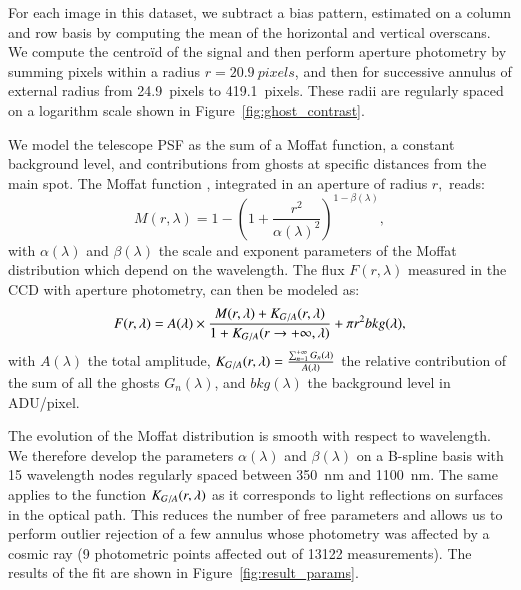 For each image in this dataset, we subtract a bias pattern, estimated on a column and row basis by computing the mean of the horizontal and vertical overscans. We compute the centroïd of the signal and then perform aperture photometry by summing pixels within a radius $r=\SI{20.9}{pixels}$, and then for successive annulus of external radius from \SI{24.9}{pixels} to \SI{419.1}{pixels}. These radii are regularly spaced on a logarithm scale shown in Figure~\ref{fig:ghost_contrast}.

We model the \SD telescope PSF as the sum of a Moffat function, a constant background level, and contributions from ghosts at specific distances from the main spot. The Moffat function \citep{moffat}, integrated in an aperture of radius $r,$ reads:
\begin{equation}
M(r, \lambda)= 1 - \left( 1+\frac{r^2}{\alpha(\lambda)^2} \right)^{1-\beta(\lambda)},
\end{equation}
with $\alpha(\lambda)$ and $\beta(\lambda)$ the scale and exponent parameters of the Moffat distribution which depend on the wavelength. The flux $F(r, \lambda)$ measured in the CCD with aperture photometry, can then be modeled as: 
\begin{equation}
F(r, \lambda) = A(\lambda) \times \frac{M(r, \lambda) + K_{G/A}(r, \lambda)}{1 + K_{G/A}(r \rightarrow +\infty, \lambda)} + \pi r^2 bkg(\lambda),
\label{eq:moffat_model}
\end{equation}
with $A(\lambda)$ the total amplitude, $K_{G/A}(r, \lambda) = \frac{\sum_{n=1}^{+\infty} G_n(\lambda)}{A(\lambda)}$ the relative contribution of the sum of all the ghosts $G_n(\lambda)$, and $bkg(\lambda)$ the background level in ADU/pixel. 

The evolution of the Moffat distribution is smooth with respect to wavelength. We therefore develop the parameters $\alpha(\lambda)$ and $\beta(\lambda)$  on a B-spline basis with 15 wavelength nodes regularly spaced between \SI{350}{\nano\meter} and \SI{1100}{\nano\meter}. The same applies to the function $K_{G/A}(r, \lambda)$ as it corresponds to light reflections on surfaces in the optical path. This reduces the number of free parameters and allows us to perform outlier rejection of a few annulus whose photometry was affected by a cosmic ray (9 photometric points affected out of 13122 measurements). The results of the fit are shown in Figure~\ref{fig:result_params}. 

